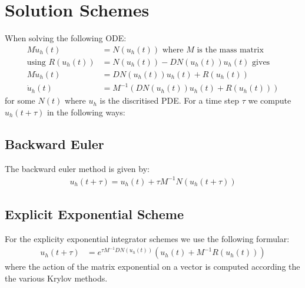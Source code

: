 \section{Solution Schemes}

When solving the following ODE:
\begin{align*}
M\dot u_h(t) &= N(u_h(t)) \text{ where $M$ is the mass matrix}\\
\text{using } R(u_h(t)) &= N(u_h(t)) - DN(u_h(t))u_h(t) \text{ gives}\\
M\dot u_h(t) &= DN(u_h(t))u_h(t) + R(u_h(t))\\
\dot u_h(t) &= M^{-1}(DN(u_h(t))u_h(t) + R(u_h(t)))
\end{align*}
for some $N(t)$ where $u_h$ is the discritised PDE.
For a time step $\tau$ we compute $u_h(t+\tau)$ in the following ways: 
\subsection{Backward Euler}
The backward euler method is given by:
\begin{align*}
u_h(t+\tau) = u_h(t) + \tau M^{-1}N(u_h(t+\tau))
\end{align*}
\subsection{Explicit Exponential Scheme} %
For the explicity exponential integrator schemes we use the following formular:
\begin{align*}
u_h(t+\tau) &= e^{\tau M^{-1} DN(u_h(t))}(u_h(t) + M^{-1}R(u_h(t)))
\end{align*}
where the action of the matrix exponential on a vector is computed according the the various Krylov methods.
